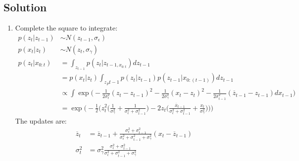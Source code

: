 \documentclass[submit]{harvardml}
\begin{document}
\subsection*{Solution}
\begin{enumerate}
    \item Complete the square to integrate:
        \begin{align*}
            p(z_t|z_{t-1}) &\sim N(z_{t-1},\sigma_{\epsilon}) \\
                p(x_t|z_t) &\sim N(z_t,\sigma_{\gamma}) \\
            p(z_t|x_{0:t}) &= \int_{z_{t-1}}
                              p(z_t|z_{t-1,x_{0:t}})dz_{t-1} \\
                           &= p(x_t|z_t) \int_{z_Pt-1}p(z_t|z_{t-1})
                              p(z_{t-1}|x_{0:(t-1)})dz_{t-1} \\
                           &\propto \int
                              \exp\bigg(-\frac{1}{2\sigma_\epsilon^2}(z_t -
                              z_{t-1})^2 -
                              \frac{1}{2\sigma_\gamma^2}(x_t-z_t)^2 -
                              \frac{1}{2\sigma_{t-1}^2}
                              (\overline{z}_{t-1}-z_{t-1})dx_{t-1} \bigg) \\
                           &= \exp\bigg(-\frac{1}{2}\bigg(z_t^2
                              \bigg(\frac{1}{\sigma_\gamma^2} +
                              \frac{1}{\sigma_\epsilon^2 + \sigma_{t-1}^2}
                              \bigg) - 2z_t
                              \bigg(\frac{\overline{x}_{t-1}}{\sigma_\epsilon^2
                              + \sigma_{t-1}^2} + \frac{x_t}{\sigma_\gamma^2}
                              \bigg) \bigg) \bigg)
        \end{align*}
        The updates are:
        \begin{align*}
            \overline{z}_t &= \overline{z}_{t-1} + \frac{\sigma_\epsilon^2 +
                              \sigma_{t-1}^2}{\sigma_\epsilon^2
                              + \sigma_{t-1}^2 + \sigma_\gamma^2}(x_t -
                              \overline{z}_{t-1}) \\
                \sigma_t^2 &= \sigma_\gamma^2 \frac{\sigma_\epsilon^2 +
                              \sigma_{t-1}^2}{\sigma_\epsilon^2
                              + \sigma_{t-1}^2 + \sigma_\gamma^2}
        \end{align*}


\end{enumerate}
\end{document}
